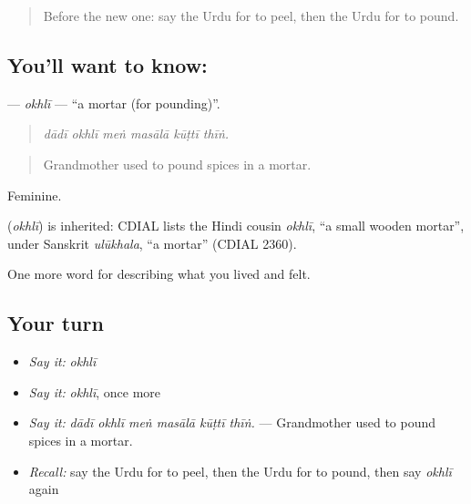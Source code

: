 \label{lesson:UR-C510-okhli}



\begin{quote}
Before the new one: say the Urdu for to peel, then the Urdu for to pound.
\end{quote}

\subsection*{You'll want to know: }
\textbf{} — \emph{okhlī} — \textquotedblleft{}a mortar (for pounding)\textquotedblright{}.

\begin{quote}
     
\end{quote}

\begin{quote}
\emph{dādī okhlī meṅ masālā kūṭtī thīṅ.}
\end{quote}

\begin{quote}
Grandmother used to pound spices in a mortar.
\end{quote}

Feminine.

\begin{cousinweb}
\textbf{} (\emph{okhlī}) is inherited: CDIAL lists the Hindi cousin \emph{okhlī}, \textquotedblleft{}a small wooden mortar\textquotedblright{}, under Sanskrit \emph{ulūkhala}, \textquotedblleft{}a mortar\textquotedblright{} (CDIAL 2360).
\end{cousinweb}

\begin{grammarlens}[title={What you've built}]
One more word for describing what you lived and felt.
\end{grammarlens}

\subsection*{Your turn}
\begin{itemize}
\raggedright
  \item \emph{Say it:} \emph{okhlī}
  \item \emph{Say it:} \emph{okhlī}, once more
  \item \emph{Say it:} \emph{dādī okhlī meṅ masālā kūṭtī thīṅ.} — Grandmother used to pound spices in a mortar.
  \item \emph{Recall:} say the Urdu for to peel, then the Urdu for to pound, then say \emph{okhlī} again
\end{itemize}

